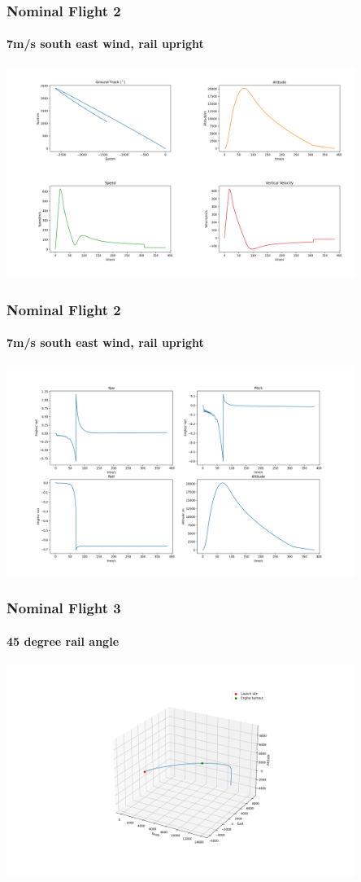 \documentclass{beamer}
\begin{document}
    \begin{frame}
        \frametitle{Nominal Flight 2}
        \framesubtitle{7m/s south east wind, rail upright}
        \includegraphics[width=0.85\textwidth]{images/example2a.png}
    \end{frame}
    \begin{frame}
        \frametitle{Nominal Flight 2}
        \framesubtitle{7m/s south east wind, rail upright}
        \includegraphics[width=0.85\textwidth]{images/example2b.png}
    \end{frame}
    \begin{frame}
        \frametitle{Nominal Flight 3}
        \framesubtitle{45 degree rail angle}
        \includegraphics[width=0.85\textwidth]{images/example3.png}
    \end{frame}
\end{document}
